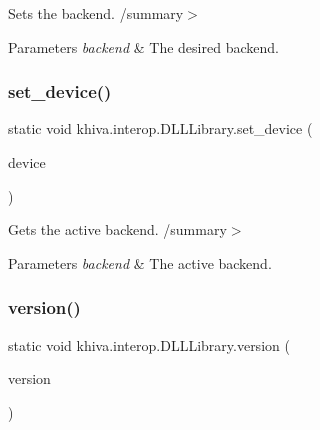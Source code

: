 Sets the backend. /summary$>$ 
\begin{DoxyParams}{Parameters}
{\em backend} & The desired backend.\\
\hline
\end{DoxyParams}


\mbox{\label{classkhiva_1_1interop_1_1_d_l_l_library_aab970f341d2b40489672c960f6f67203}} 
\subsubsection{\texorpdfstring{set\+\_\+device()}{set\_device()}}
{\footnotesize\ttfamily static void khiva.\+interop.\+D\+L\+L\+Library.\+set\+\_\+device (\begin{DoxyParamCaption}\item[{\mbox{[}\+In, Out\mbox{]} ref int}]{device }\end{DoxyParamCaption})\hspace{0.3cm}{\ttfamily [static]}}



Gets the active backend. /summary$>$ 
\begin{DoxyParams}{Parameters}
{\em backend} & The active backend.\\
\hline
\end{DoxyParams}


\mbox{\label{classkhiva_1_1interop_1_1_d_l_l_library_a143d6d635c6fc596dcad11bfa72bce64}} 
\subsubsection{\texorpdfstring{version()}{version()}}
{\footnotesize\ttfamily static void khiva.\+interop.\+D\+L\+L\+Library.\+version (\begin{DoxyParamCaption}\item[{\mbox{[}\+In, Out\mbox{]} ref String\+Builder}]{version }\end{DoxyParamCaption})}




